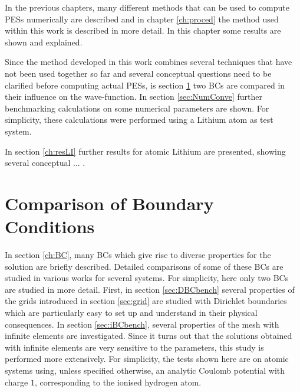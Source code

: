 In the previous chapters, many different methods that can be used to compute PESs numerically are described and in chapter \ref{ch:proced} the method used within this work is described in more detail.
In this chapter some results are shown and explained.

Since the method developed in this work combines several techniques that have not been used together so far and several conceptual questions need to be clarified before computing actual PESs, is section \ref{ch:BCbench} two BCs are compared in their influence on the wave-function. In section \ref{sec:NumConve} further benchmarking calculations on some numerical parameters are shown.
For simplicity, these calculations were performed using a Lithium atom as test system.

In section \ref{ch:resLI} further results for atomic Lithium are presented, showing several conceptual ... .


\section{Comparison of Boundary Conditions}
\label{ch:BCbench}
In section \ref{ch:BC}, many BCs which give rise to diverse properties for the solution are briefly described.
Detailed comparisons of some of these BCs are studied in various works \cite{babuska,artBC,capComp,absRev,nrBCrev} for several systems.
For simplicity, here only two BCs are studied in more detail.
First, in section \ref{sec:DBCbench} several properties of the grids introduced in section \ref{sec:grid} are studied with Dirichlet boundaries which are particularly easy to set up and understand in their physical consequences.
In section \ref{sec:iBCbench}, several properties of the mesh with infinite elements are investigated.
Since it turns out that the solutions obtained with infinite elements are very sensitive to the parameters, this study is performed more extensively.
For simplicity, the tests shown here are on atomic systems using, unless specified otherwise, an analytic Coulomb potential with charge $1$, corresponding to the ionised hydrogen atom.

